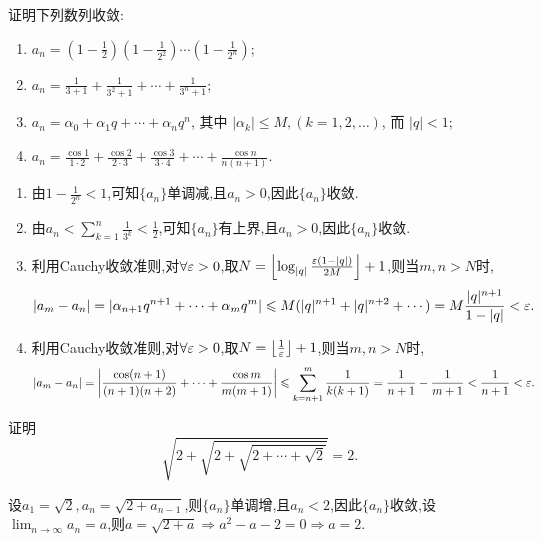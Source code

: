 \begin{exercise}[1.2.17]
    证明下列数列收敛:
    \begin{enumerate}[(1)]
        \item $a_n = \left(1 - \frac{1}{2}\right) \left(1 - \frac{1}{2^2}\right) \cdots \left(1 - \frac{1}{2^n}\right)$;
        \item $a_n = \frac{1}{3+1} + \frac{1}{3^2+1} + \cdots + \frac{1}{3^n+1}$;
        \item $a_n = \alpha_0 + \alpha_1 q + \cdots + \alpha_n q^n$, 其中 $|\alpha_k| \le M, (k=1, 2, \ldots)$, 而 $|q| < 1$;
        \item $a_n = \frac{\cos 1}{1 \cdot 2} + \frac{\cos 2}{2 \cdot 3} + \frac{\cos 3}{3 \cdot 4} + \cdots + \frac{\cos n}{n(n+1)}$.
    \end{enumerate}
\end{exercise}

\begin{solution}
    \begin{enumerate}[(1)]
        \item 由$1-\frac{1}{2^n} < 1$,可知$\{a_n\}$单调减,且$a_n > 0$,因此$\{a_n\}$收敛.
        \item 由$a_n < \sum_{k=1}^n \frac{1}{3^k} < \frac 12$,可知$\{a_n\}$有上界,且$a_n > 0$,因此$\{a_n\}$收敛.
        \item 利用Cauchy收敛准则,对$\forall \varepsilon >0$,取$N = \left\lfloor \log_{|q|} \frac{\varepsilon(1-|q|)}{2M} \right\rfloor + 1$,则当$m,n>N$时,$$|a_m-a_n| = |\alpha_{n+1}q^{n+1}+\cdots+\alpha_m q^m| \leqslant M(|q|^{n+1}+|q|^{n+2}+\cdots) = M\frac{|q|^{n+1}}{1-|q|} < \varepsilon.$$
        \item 利用Cauchy收敛准则,对$\forall \varepsilon >0$,取$N = \left\lfloor \frac{1}{\varepsilon} \right\rfloor + 1$,则当$m,n>N$时,$$|a_m-a_n| = \left|\frac{\cos(n+1)}{(n+1)(n+2)}+\cdots+\frac{\cos m}{m(m+1)}\right| \leqslant \sum_{k=n+1}^m \frac{1}{k(k+1)} = \frac{1}{n+1} - \frac{1}{m+1} < \frac{1}{n+1} < \varepsilon.$$
    \end{enumerate}
\end{solution}

\begin{example}
    证明$$\sqrt{2+\sqrt{2+\sqrt{2+\cdots+\sqrt{2}}}} = 2.$$
\end{example}

\begin{solution}
    设$a_1 = \sqrt{2}, a_n = \sqrt{2+a_{n-1}}$,则$\{a_n\}$单调增,且$a_n < 2$,因此$\{a_n\}$收敛,设$\lim_{n \to \infty} a_n = a$,则$a = \sqrt{2+a} \Rightarrow a^2 - a - 2 = 0 \Rightarrow a = 2$.
\end{solution}

